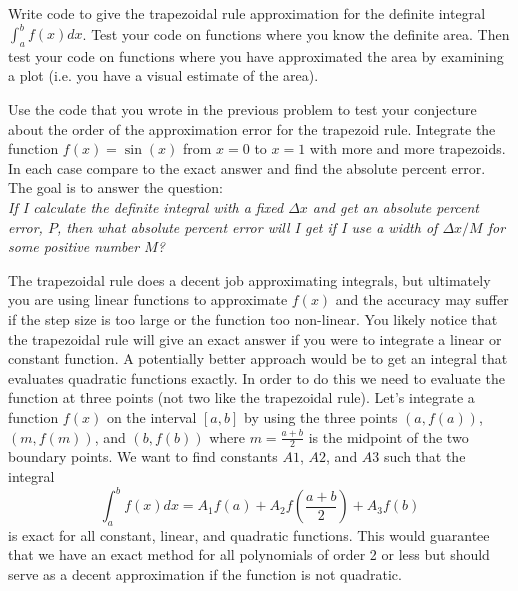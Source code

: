 \begin{problem}
    Write code to give the trapezoidal rule approximation for the definite integral
    $\int_a^b f(x) dx$.  Test your code on functions where you know the definite area.
    Then test your code on functions where you have approximated the area by examining a
    plot (i.e. you have a visual estimate of the area).
\end{problem}

\begin{problem}
    Use the code that you wrote in the previous problem to test your conjecture about the
    order of the approximation error for the trapezoid rule.  Integrate the function $f(x)
    = \sin(x)$ from $x=0$ to $x=1$ with more and more trapezoids.  In each case compare to
    the exact answer and find the absolute percent error.  The goal is to answer the
    question: \\
    {\it If I calculate the definite integral with a fixed $\Delta x$ and get an absolute
    percent error, $P$, then what absolute percent error will I get if I use a width of
$\Delta x / M$ for some positive number $M$?}
\end{problem}

The trapezoidal rule does a decent job approximating integrals, but ultimately you are
using linear functions to approximate $f(x)$ and the accuracy may suffer if the step
size is too large or the function too non-linear. You likely notice that the trapezoidal
rule will give an exact answer if you were to integrate a linear or constant function. A
potentially better approach would be to get an integral that evaluates quadratic functions
exactly. In order to do this we need to evaluate the function at three points (not two
like the trapezoidal rule). Let's integrate a function $f(x)$ on the interval
$[a,b]$ by using the three points $(a,f(a))$, $(m,f(m))$, and
$(b,f(b))$ where $m=\frac{a+b}{2}$ is the midpoint of the two boundary points. We want to
find constants $A1$, $A2$, and $A3$ such that the integral
\[ \int_a^b f(x) dx = A_1 f(a) + A_2 f\left( \frac{a+b}{2} \right) + A_3 f(b) \]
is exact for all constant, linear, and quadratic functions. This would guarantee that we
have an exact method for all polynomials of order 2 or less but should serve as a decent
approximation if the function is not quadratic.

